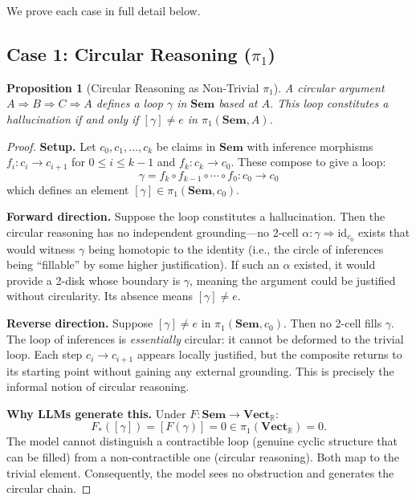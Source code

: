 \documentclass[11pt,a4paper]{article}
\theoremstyle{plain}
\newtheorem{proposition}[theorem]{Proposition}
\theoremstyle{definition}
\theoremstyle{remark}
\newcommand{\Sem}{\mathbf{Sem}}
\newcommand{\Vect}{\mathbf{Vect}}
\newcommand{\id}{\mathrm{id}}
\newcommand{\R}{\mathbb{R}}
\begin{document}
We prove each case in full detail below.

\subsection{Case 1: Circular Reasoning ($\pi_1$)}
\label{sec:case1}

\begin{proposition}[Circular Reasoning as Non-Trivial $\pi_1$]
\label{prop:case1}
A circular argument $A \Rightarrow B \Rightarrow C \Rightarrow A$ defines a loop $\gamma$ in $\Sem$ based at $A$. This loop constitutes a hallucination if and only if $[\gamma] \neq e$ in $\pi_1(\Sem, A)$.
\end{proposition}

\begin{proof}
\textbf{Setup.} Let $c_0, c_1, \ldots, c_k$ be claims in $\Sem$ with inference morphisms $f_i: c_i \to c_{i+1}$ for $0 \leq i \leq k-1$ and $f_k: c_k \to c_0$. These compose to give a loop:
\[
\gamma = f_k \circ f_{k-1} \circ \cdots \circ f_0 : c_0 \to c_0
\]
which defines an element $[\gamma] \in \pi_1(\Sem, c_0)$.

\textbf{Forward direction.} Suppose the loop constitutes a hallucination. Then the circular reasoning has no independent grounding---no 2-cell $\alpha: \gamma \Rightarrow \id_{c_0}$ exists that would witness $\gamma$ being homotopic to the identity (i.e., the circle of inferences being ``fillable'' by some higher justification). If such an $\alpha$ existed, it would provide a 2-disk whose boundary is $\gamma$, meaning the argument could be justified without circularity. Its absence means $[\gamma] \neq e$.

\textbf{Reverse direction.} Suppose $[\gamma] \neq e$ in $\pi_1(\Sem, c_0)$. Then no 2-cell fills $\gamma$. The loop of inferences is \emph{essentially} circular: it cannot be deformed to the trivial loop. Each step $c_i \to c_{i+1}$ appears locally justified, but the composite returns to its starting point without gaining any external grounding. This is precisely the informal notion of circular reasoning.

\textbf{Why LLMs generate this.} Under $F: \Sem \to \Vect_{\R}$:
\[
F_*([\gamma]) = [F(\gamma)] = 0 \in \pi_1(\Vect_{\R}) = 0.
\]
The model cannot distinguish a contractible loop (genuine cyclic structure that can be filled) from a non-contractible one (circular reasoning). Both map to the trivial element. Consequently, the model sees no obstruction and generates the circular chain.


\end{proof}
\end{document}

